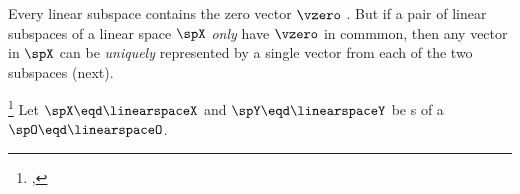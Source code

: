 Every linear subspace contains the zero vector $\vzero$ .
But if a pair of linear subspaces of a linear space $\spX$ \emph{only} have $\vzero$ in commmon, then 
any vector in $\spX$ can be \emph{uniquely} represented by a single vector from each of the two subspaces (next).
\begin{theorem}
\footnote{
  ,
  }
\label{thm:XY0_unique}
Let $\spX\eqd\linearspaceX$ and $\spY\eqd\linearspaceY$ be s  
of a   $\spO\eqd\linearspaceO$.
\end{theorem}
